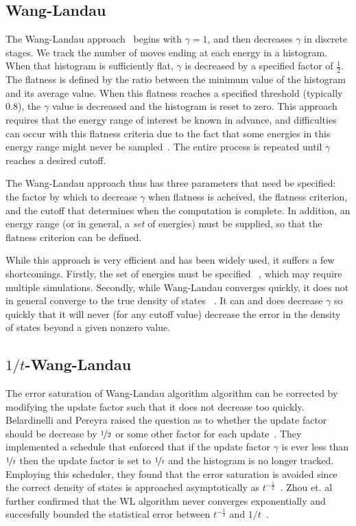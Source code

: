 \documentclass[letterpaper,twocolumn,amsmath,amssymb,pre,aps,10pt]{revtex4-1}
\begin{document}
\subsection{Wang-Landau}

The Wang-Landau approach~\cite{wang2001efficient,wang2001determining,
  landau2014guide} begins with $\gamma=1$, and then decreases $\gamma$
in discrete stages.  We track the number of moves ending at each
energy in a histogram.  When that histogram is sufficiently flat,
$\gamma$ is decreased by a specified factor of $\frac12$.  The
flatness is defined by the ratio between the minimum value of the
histogram and its average value.  When this flatness reaches a
specified threshold (typically 0.8), the $\gamma$ value is decreased
and the histogram is reset to zero.  This approach requires that the
energy range of interest be known in advance, and difficulties can
occur with this flatness criteria due to the fact that some energies
in this energy range might never be
sampled~\cite{haber2014transition}.  The entire process is repeated
until $\gamma$ reaches a desired cutoff.

The Wang-Landau approach thus has three parameters that need be
specified: the factor by which to decrease $\gamma$ when flatness is
acheived, the flatness criterion, and the cutoff that determines when
the computation is complete.  In addition, an energy range (or in
general, a \emph{set} of energies) must be supplied, so that the
flatness criterion can be defined.

While this approach is very efficient and has been widely used, it
suffers a few shortcomings.  Firstly, the set of energies must be
specified ~\cite{wang2001efficient, schulz2003avoiding, yan2003fast},
which may require multiple simulations. Secondly, while Wang-Landau
converges quickly, it does not in general converge to the true density
of states ~\cite{belardinelli2008analysis, zhou2008optimal}.  It can
and does decrease $\gamma$ so quickly that it will never (for any
cutoff value) decrease the error in the density of states beyond a
given nonzero value.

\subsection{$1/t$-Wang-Landau}
The error saturation of Wang-Landau algorithm algorithm can be
corrected by modifying the update factor such that it does not
decrease too quickly.  Belardinelli and Pereyra raised the question as
to whether the update factor should be decrease by $\nicefrac12$ or
some other factor for each update~\cite{belardinelli2007fast}. They
implemented a schedule that enforced that if the update factor
$\gamma$ is ever less than $\nicefrac{1}{t}$ then the update factor
is set to $\nicefrac{1}{t}$ and the histogram is no longer tracked. Employing this
scheduler, they found that the error saturation is avoided since the
correct density of states is approached asymptotically as
$t^{-\frac12}$~\cite{belardinelli2008analysis}. Zhou et. al further
confirmed that the WL algorithm never converges exponentially and
succesfully bounded the statistical error between $t^{-\frac12}$ and
$1/t$~\cite{zhou2008optimal}.
\end{document}
